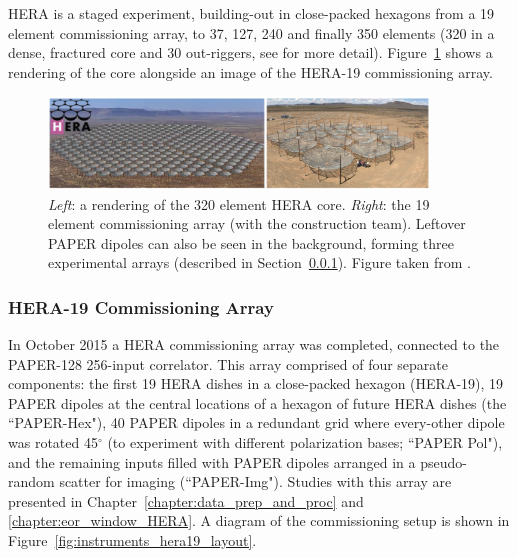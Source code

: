 HERA is a staged experiment, building-out in close-packed hexagons from a 19 element commissioning array, to 37, 127, 240 and finally 350 elements (320 in a dense, fractured core and 30 out-riggers, see \citealt{Dillon.16} for more detail). Figure~\ref{fig:instruments_hera_layout} shows a rendering of the core alongside an image of the HERA-19 commissioning array.

\begin{figure}
\centering
\includegraphics[width=0.9\textwidth]{chapters/instruments/figures/HERAlayout_deBoer.png}
\caption[Future vision and physical commissioning HERA layout.]{\textit{Left}: a rendering of the 320 element HERA core. \textit{Right}: the 19 element commissioning array (with the construction team). Leftover PAPER dipoles can also be seen in the background, forming three experimental arrays (described in Section~\ref{subsubsec:instruments_hera19}). Figure taken from \cite{deBoer.17}.}
\label{fig:instruments_hera_layout}
\end{figure}

\subsubsection{HERA-19 Commissioning Array}
\label{subsubsec:instruments_hera19}

In October 2015 a HERA commissioning array was completed, connected to the PAPER-128 256-input correlator. This array comprised of four separate components: the first 19 HERA dishes in a close-packed hexagon (HERA-19), 19 PAPER dipoles at the central locations of a hexagon of future HERA dishes (the ``PAPER-Hex"), 40 PAPER dipoles in a redundant grid where every-other dipole was rotated 45$^{\circ}$ (to experiment with different polarization bases; ``PAPER Pol"), and the remaining inputs filled with PAPER dipoles arranged in a pseudo-random scatter for imaging (``PAPER-Img"). Studies with this array are presented in Chapter~\ref{chapter:data_prep_and_proc} and \ref{chapter:eor_window_HERA}. A diagram of the commissioning setup is shown in Figure~\ref{fig:instruments_hera19_layout}.

